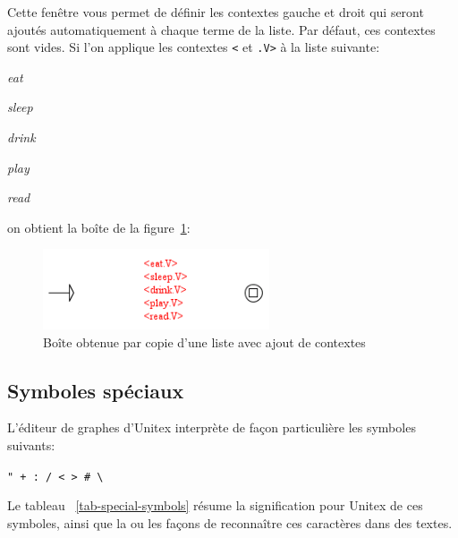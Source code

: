 \noindent Cette fenêtre vous permet de définir les contextes gauche et droit qui seront ajoutés
automatiquement à chaque terme de la liste. Par défaut, ces contextes sont vides. Si l’on applique
les contextes \verb+<+ et \verb+.V>+ à la liste suivante:

\bigskip
\textit{eat}

\textit{sleep}

\textit{drink}

\textit{play}

\textit{read}

\bigskip
\noindent on obtient la boîte de la figure~\ref{fig-multiple-copy}:

\bigskip
\begin{figure}[h]
\begin{center}
\includegraphics[width=6.7cm]{resources/img/fig5-19.png}
\caption{Boîte obtenue par copie d’une liste avec ajout de contextes\label{fig-multiple-copy}}
\end{center}
\end{figure}

\subsection{Symboles spéciaux}
\noindent L’éditeur de graphes d’Unitex interprète de façon particulière les symboles suivants:

\bigskip
\verb," + : / < > # \,

\bigskip
\noindent Le tableau ~\ref{tab-special-symbols} résume la signification pour Unitex de ces symboles,
ainsi que la ou les façons de reconnaître ces caractères dans des textes.


